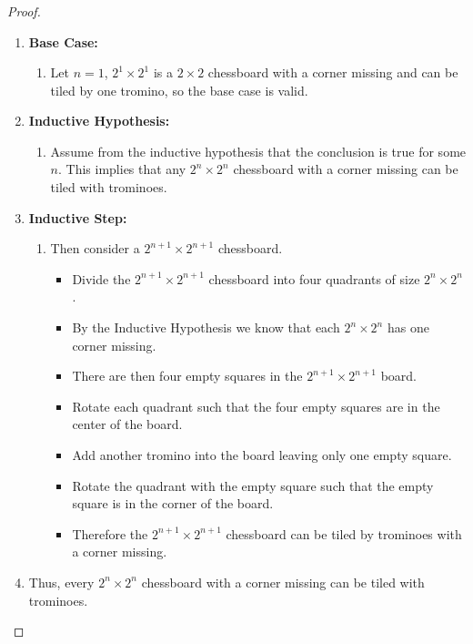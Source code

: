 \documentclass[class=article, crop=false]{standalone}
\begin{document}
\subsubsection{}
\begin{proof}
	$ $
	\begin{enumerate}
	  \item[] \textbf{Base Case:}
		\begin{enumerate}
		  \item[] Let $n=1$, $2^1 \times 2^1$ is a $2\times2$ chessboard with a corner missing and can 
		  be tiled by one tromino, so the base case is valid.
		\end{enumerate} 
	  \item[] \textbf{Inductive Hypothesis:}
		\begin{enumerate}
		  \item[] Assume from the inductive hypothesis that the conclusion is true for some $n$. This implies that any
		  $2^n \times 2^n$ chessboard with a corner missing can be tiled with trominoes.
		\end{enumerate}
	  \item[] \textbf{Inductive Step:}
		\begin{enumerate}
		  \item[] Then consider a $2^{n+1} \times 2^{n+1}$ chessboard.
		  \begin{itemize}
			\item Divide the $2^{n+1}\times 2^{n+1}$ chessboard into four quadrants of size $2^n \times 2^n$.
			\item By the Inductive Hypothesis we know that each $2^n\times 2^n$ has one corner missing.
			\item There are then four empty squares in the $2^{n+1}\times 2^{n+1}$ board.
			\item Rotate each quadrant such that the four empty squares are in the center of the board.
			\item Add another tromino into the board leaving only one empty square.
			\item Rotate the quadrant with the empty square such that the empty square is in the corner of the board.
			\item Therefore the $2^{n+1}\times 2^{n+1}$ chessboard can be tiled by trominoes with a corner missing.
		  \end{itemize} 
		\end{enumerate}
	  \item[] Thus, every $2^n \times 2^n$ chessboard with a corner missing can be tiled with trominoes.
	\end{enumerate}    
  \end{proof}
\end{document}
